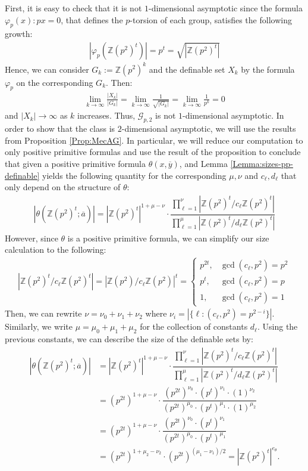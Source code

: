 \documentclass[11pt]{amsart}
\theoremstyle{definition}
\newcommand{\Z}{\mathbb{Z}}
\newcommand{\ov}[1]{\overline{#1}}
\begin{document}
First, it is easy to check that it is not $1$-dimensional asymptotic since the formula $\varphi_p(x):px=0$, that defines the $p$-torsion of each group, satisfies the following growth:
\begin{align*}
    \left|\varphi_p\left(\Z(p^2)^t\right)\right| = p^t = \sqrt{|\Z(p^2)^t|}
\end{align*}
Hence, we can consider $G_k:=\Z(p^2)^k$ and the definable set $X_k$ by the formula $\varphi_p$ on the corresponding $G_k$. Then:
\begin{align*}
    \lim\limits_{k\to\infty}\frac{|X_k|}{|G_k|}=\lim\limits_{k\to\infty}\frac{1}{\sqrt{|G_k|}}=\lim\limits_{k\to\infty}\frac{1}{p^k}=0
\end{align*}
and $|X_k|\to\infty$ as $k$ increases. Thus, $\mathcal{G}_{p,2}$ is not $1$-dimensional asymptotic. In order to show that the class is $2$-dimensional asymptotic, we will use the results from Proposition \ref{Prop:MecAG}. In particular, we will reduce our computation to only positive primitive formulas and use the result of the proposition to conclude that given a positive primitive formula $\theta(x,\overline{y})$, and Lemma \ref{Lemma:sizes-pp-definable} yields the following quantity for the corresponding $\mu,\nu$ and $c_\ell,d_\ell$ that only depend on the structure of $\theta$:
\begin{align*}
    |\theta(\Z(p^2)^t;\ov{a})|=|\Z(p^2)^t|^{1+\mu-\nu}\cdot \dfrac{\prod_{\ell=1}^\nu |\Z(p^2)^t/c_\ell \Z(p^2)^t|}{\prod_{\ell=1}^\mu|\Z(p^2)^t/d_\ell \Z(p^2)^t|}
\end{align*}
However, since $\theta$ is a positive primitive formula, we can simplify our size calculation to the following:
\begin{align*}
    |\Z(p^2)^t/c_\ell \Z(p^2)^t| = |\Z(p^2)/c_\ell \Z(p^2)|^t  = \begin{cases}
        p^{2t}, & \gcd(c_\ell,p^2)=p^2\\
        p^t, & \gcd(c_\ell,p^2)=p\\
        1, & \gcd(c_\ell,p^2)=1
    \end{cases}
\end{align*}
Then, we can rewrite $\nu = \nu_0+\nu_1+\nu_2$ where $\nu_i=\left|\{\ell:(c_\ell,p^2)=p^{2-i}\}\right|$. Similarly, we write $\mu=\mu_0+\mu_1+\mu_2$ for the collection of constants $d_\ell$. Using the previous constants, we can describe the size of the definable sets by:
\begin{align*}
    |\theta(\Z(p^2)^t;\ov{a})|&=|\Z(p^2)^t|^{1+\mu-\nu}\cdot \dfrac{\prod_{\ell=1}^\nu |\Z(p^2)^t/c_\ell \Z(p^2)^t|}{\prod_{\ell=1}^\mu|\Z(p^2)^t/d_\ell \Z(p^2)^t|}\\
    &=(p^{2t})^{1+\mu-\nu}\cdot \dfrac{(p^{2t})^{\nu_0}\cdot(p^{t})^{\nu_1}\cdot(1)^{\nu_2}}{(p^{2t})^{\mu_0}\cdot(p^{t})^{\mu_1}\cdot(1)^{\mu_2}}\\
    &=(p^{2t})^{1+\mu-\nu}\cdot \dfrac{(p^{2t})^{\nu_0}\cdot(p^{t})^{\nu_1}}{(p^{2t})^{\mu_0}\cdot(p^{t})^{\mu_1}}\\
    &=(p^{2t})^{1+\mu_2-\nu_2}\cdot (p^{2t})^{(\mu_1-\nu_1)/2}=|\Z(p^2)^t|^{e_{\theta}}.
\end{align*}
\end{document}
